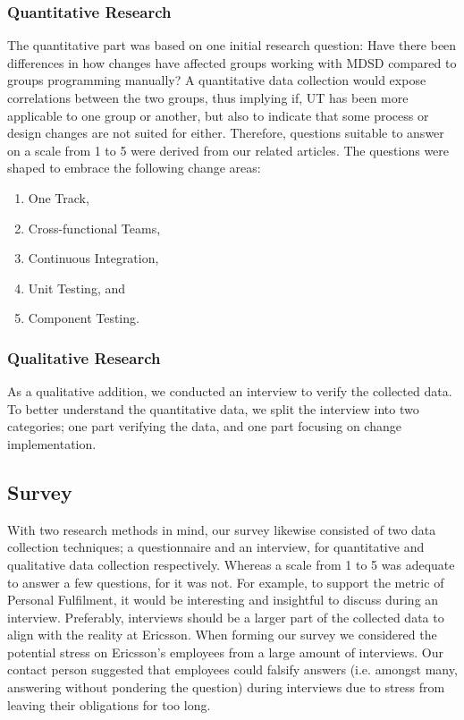 \documentclass[final_report_innit.tex]{subfiles}
\begin{document}
\subsubsection{Quantitative Research}\label{approachQuant}
The quantitative part was based on one initial research question: Have there been differences in how changes have affected groups working with MDSD compared to groups programming manually? A quantitative data collection would expose correlations between the two groups, thus implying if, UT has been more applicable to one group or another, but also to indicate that some process or design changes are not suited for either. Therefore, questions suitable to answer on a scale from 1 to 5 were derived from our related articles. The questions were shaped to embrace the following change areas:
\\
\begin{enumerate}
	\item One Track,
	\item Cross-functional Teams,
	\item Continuous Integration,
	\item Unit Testing, and
	\item Component Testing. \\ %
\end{enumerate}

\subsubsection{Qualitative Research}\label{approachQual}
As a qualitative addition, we conducted an interview to verify the collected data. To better understand the quantitative data, we split the interview into two categories; one part verifying the data, and one part focusing on change implementation.

\subsection{Survey}\label{approachSurvey}
With two research methods in mind, our survey likewise consisted of two data collection techniques; a questionnaire and an interview, for quantitative and qualitative data collection respectively. Whereas a scale from 1 to 5 was adequate to answer a few questions, for it was not. For example, to support the metric of Personal Fulfilment, it would be interesting and insightful to discuss during an interview. Preferably, interviews should be a larger part of the collected data to align with the reality at Ericsson. When forming our survey we considered the potential stress on Ericsson's employees from a large amount of interviews. Our contact person suggested that employees could falsify answers (i.e. amongst many, answering without pondering the question) during interviews due to stress from leaving their obligations for too long. 
\\
\end{document}

